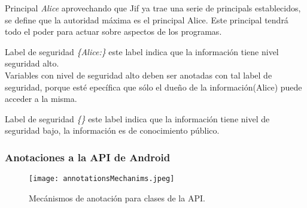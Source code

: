 Principal \emph{Alice}\newline
aprovechando que Jif ya trae una serie de principals establecidos, se define que
la autoridad máxima es el principal Alice. Este principal tendrá todo el poder
para actuar sobre aspectos de los programas.

Label de seguridad \emph{\{Alice:\}}\newline
este label indica que la información tiene nivel seguridad alto.\\
Variables con nivel de seguridad alto deben ser anotadas con tal label de
seguridad, porque esté epecífica que sólo el dueño de la información(Alice)
puede acceder a la misma. 

Label de seguridad \emph{\{\}}\newline
este label indica que la información tiene nivel de seguridad bajo,
la información es de conocimiento público.

\subsubsection{Anotaciones a la API de Android}

\begin{figure}[h!]
	\begin{center}
	\texttt{[image: annotationsMechanims.jpeg]}
	\end{center}
	\caption{Mecánismos de anotación para clases de la API.}
	\label{fig:annotationsMechanims}
\end{figure}

